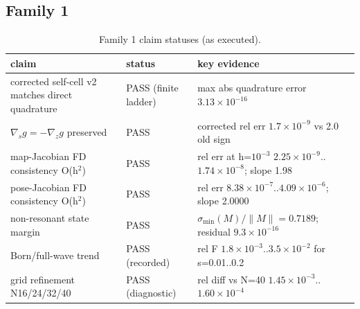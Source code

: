 \documentclass[12pt]{article}
\begin{document}
\subsection{Family 1}
\begin{table}[ht]
\centering
\small
\caption{Family 1 claim statuses (as executed).}
\label{app:tab:f1}
\begin{tabular}{p{} p{} p{}}
\toprule
claim & status & key evidence \\
\midrule
corrected self-cell v2 matches direct quadrature & PASS (finite ladder) &
max abs quadrature error $3.13\times10^{-16}$ \\
$\nabla_s g=-\nabla_z g$ preserved & PASS &
corrected rel err $1.7\times10^{-9}$ vs 2.0 old sign \\
map-Jacobian FD consistency O(h$^2$) & PASS &
rel err at h=$10^{-3}$ $2.25\times10^{-9}$..$1.74\times10^{-8}$; slope 1.98 \\
pose-Jacobian FD consistency O(h$^2$) & PASS &
rel err $8.38\times10^{-7}$..$4.09\times10^{-6}$; slope 2.0000 \\
non-resonant state margin & PASS &
$\sigma_{\min}(M)/\|M\|=0.7189$; residual $9.3\times10^{-16}$ \\
Born/full-wave trend & PASS (recorded) &
rel F $1.8\times10^{-3}$..$3.5\times10^{-2}$ for s=0.01..0.2 \\
grid refinement N16/24/32/40 & PASS (diagnostic) &
rel diff vs N=40 $1.45\times10^{-3}$..$1.60\times10^{-4}$ \\
\bottomrule
\end{tabular}
\end{table}
\end{document}
